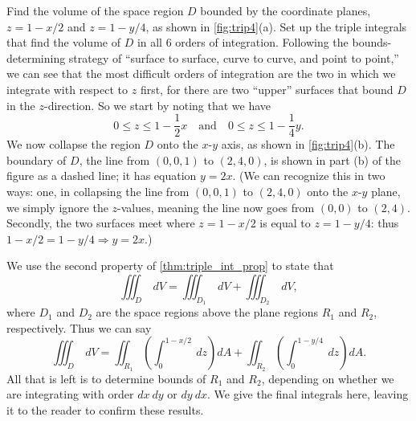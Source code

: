 \begin{example}\label{ex_trip4}
Find the volume of the space region $D$ bounded by the coordinate planes, $z=1-x/2$ and $z=1-y/4$, as shown in \autoref{fig:trip4}(a). Set up the triple integrals that find the volume of $D$ in all 6 orders of integration.
\solution
Following the bounds-determining strategy of ``surface to surface, curve to curve, and point to point,''  we can see that the most difficult orders of integration are the two in which we integrate with respect to $z$ first, for there are two ``upper'' surfaces that bound $D$ in the $z$-direction. So we start by noting that we have 
\[0\leq z\leq 1-\frac12x \quad\text{and}\quad 0\leq z\leq 1-\frac14y.\]
We now collapse the region $D$ onto the $x$-$y$ axis, as shown in \autoref{fig:trip4}(b). The boundary of $D$, the line from $(0,0,1)$ to $(2,4,0)$, is shown in part (b) of the figure as a dashed line; it has equation $y=2x$. (We can recognize this in two ways: one, in collapsing the line from $(0,0,1)$ to $(2,4,0)$ onto the $x$-$y$ plane, we simply ignore the $z$-values, meaning the line now goes from $(0,0)$ to $(2,4)$. Secondly, the two surfaces meet where $z=1-x/2$ is equal to $z=1-y/4$: thus $1-x/2=1-y/4 \Rightarrow y=2x.$)

We use the second property of \autoref{thm:triple_int_prop} to state that 
\[\iiint_D \ dV = \iiint_{D_1}\ dV + \iiint_{D_2}\ dV,\]
where $D_1$ and $D_2$ are the space regions above the plane regions $R_1$ and $R_2$, respectively. Thus we can say
\[\iiint_D\ dV = \iint_{R_1}\left(\int_0^{1-x/2}\ dz\right)dA + \iint_{R_2}\left(\int_0^{1-y/4}\ dz\right)dA.\]
All that is left is to determine bounds of $R_1$ and $R_2$, depending on whether we are integrating with order $dx\ dy$ or $dy\ dx$. We give the final integrals here, leaving it to the reader to confirm these results.\\


\end{example}
